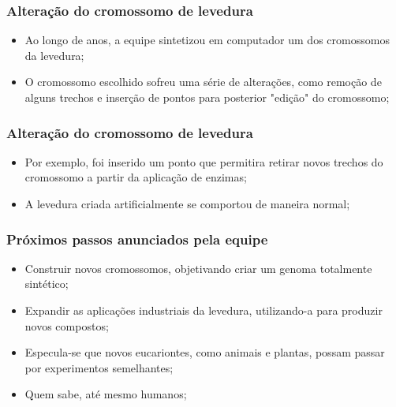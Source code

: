 \documentclass{beamer}
\begin{document}
\begin{frame}
\frametitle{Alteração do cromossomo de levedura}
\begin{itemize}
\item Ao longo de anos, a equipe sintetizou em computador um dos cromossomos da levedura;
\item O cromossomo escolhido sofreu uma série de alterações, como remoção de alguns trechos e inserção de pontos para posterior "edição" do cromossomo;
\end{itemize}
\end{frame}

\begin{frame}
\frametitle{Alteração do cromossomo de levedura}
\begin{itemize}
\item Por exemplo, foi inserido um ponto que permitira retirar novos trechos do cromossomo a partir da aplicação de enzimas;
\item A levedura criada artificialmente se comportou de maneira normal;
\end{itemize}
\end{frame}

\begin{frame}
\frametitle{Próximos passos anunciados pela equipe}
\begin{itemize}
\item Construir novos cromossomos, objetivando criar um genoma totalmente sintético;
\item Expandir as aplicações industriais da levedura, utilizando-a para produzir novos compostos;
\item Especula-se que novos eucariontes, como animais e plantas, possam passar por experimentos semelhantes;
\item Quem sabe, até mesmo humanos;
\end{itemize}
\end{frame}



\end{document}
